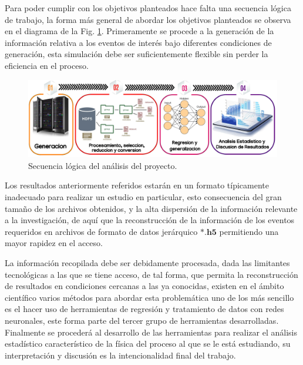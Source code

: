 Para poder cumplir con los objetivos planteados hace falta una secuencia lógica de trabajo, la forma más general de abordar los objetivos planteados se observa en el diagrama de la Fig. \ref{procesos_darksusy}. Primeramente se procede a la generación de la información relativa a los eventos de interés bajo diferentes condiciones de generación, esta simulación debe ser suficientemente flexible sin perder la eficiencia en el proceso.
\begin{figure}[!h]
\centering
\includegraphics[width=1\textwidth]{Simulacion/imagenes/procesos_darksusy.png}
\caption{Secuencia lógica del análisis del proyecto.}
\label{procesos_darksusy}
\end{figure}
Los resultados anteriormente referidos estarán en un formato típicamente inadecuado para realizar un estudio en particular, esto consecuencia del gran tamaño de los archivos obtenidos, y la alta dispersión de la información relevante a la investigación, de aquí que la reconstrucción de la información de los eventos requeridos en archivos de formato de datos jerárquico $\mathbf{*.h5}$ permitiendo una mayor rapidez en el acceso.


La información recopilada debe ser debidamente procesada, dada las limitantes tecnológicas a las que se tiene acceso, de tal forma, que permita la reconstrucción de resultados en condiciones cercanas a las ya conocidas, existen en el ámbito científico varios métodos para abordar esta problemática uno de los más sencillo es el hacer uso de herramientas de regresión y tratamiento de datos con redes neuronales, este forma parte del tercer grupo de herramientas desarrolladas. Finalmente se procederá al desarrollo de las herramientas para realizar el análisis estadístico característico de la física del proceso al que se le está estudiando, su interpretación y discusión es la intencionalidad final del trabajo. 


